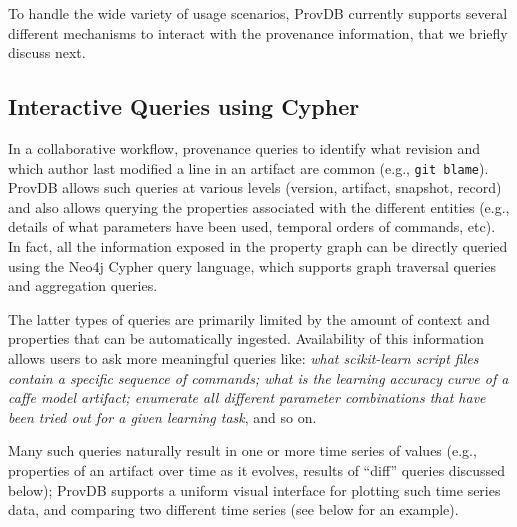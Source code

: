 \documentclass[11pt]{article}
\newcommand{\provdb}{{\sc ProvDB}\xspace}
\begin{document}
To handle the wide variety of usage scenarios, \provdb currently supports several different mechanisms to interact with the provenance information, that we briefly discuss next. 
\subsection{Interactive Queries using Cypher}
In a collaborative workflow, provenance queries to identify what revision and which author last modified a line in an artifact are common (e.g., {\tt git blame}). \provdb allows such queries at various levels (version, artifact, snapshot, record) and also allows querying the properties associated with the different entities (e.g., details of what parameters have been used, temporal orders of commands, etc). In fact, all the information exposed in the property graph can be directly queried using the Neo4j Cypher query language, which supports graph traversal queries and aggregation queries.

The latter types of queries are primarily limited by the amount of context and properties that can be automatically ingested.
Availability of this information allows users
to ask more meaningful queries like: {\em what scikit-learn script files contain a specific sequence of commands; what is the learning accuracy curve of a caffe model
    artifact; enumerate all different parameter combinations that have been tried out for a given learning task}, and so on.

\begin{figure*}[t!]
\vspace{-10pt}
\caption{Illustration of \provdb interfaces}
\vspace{-10pt}
\label{fig:showcase}
\end{figure*}


Many such queries naturally result in one or more time series of values (e.g., properties of an artifact over time as it evolves, results of ``diff'' queries discussed below); \provdb supports a uniform visual interface for plotting such time series data, and comparing two different time series (see below for an example).
\end{document}
